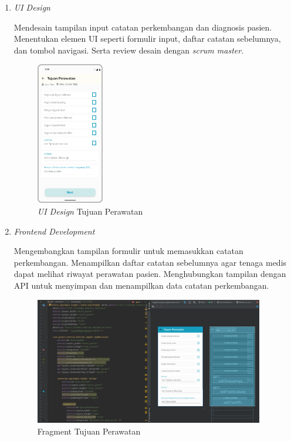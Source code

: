 \begin{enumerate}
\item \textit{UI Design}

Mendesain tampilan input catatan perkembangan dan diagnosis pasien. Menentukan elemen UI seperti formulir input, daftar catatan sebelumnya, dan tombol navigasi. Serta review desain dengan \textit{scrum master}.
	\begin{figure}[H]
		\centering
		\includegraphics[keepaspectratio, width=3cm]{gambar/tampilan_tujuan_perawatan}
		\caption{\textit{UI Design} Tujuan Perawatan}
		\label{gambar:tampilan_tujuan_perawatan}
	\end{figure}
\item \textit{Frontend Development}

Mengembangkan tampilan formulir untuk memasukkan catatan perkembangan. Menampilkan daftar catatan sebelumnya agar tenaga medis dapat melihat riwayat perawatan pasien. Menghubungkan tampilan dengan API untuk menyimpan dan menampilkan data catatan perkembangan.
	\begin{figure}[H]
		\centering
		\includegraphics[keepaspectratio, width=10cm]{gambar/fragment_tujuan_perawatan}
		\caption{Fragment Tujuan Perawatan}
		\label{gambar:fragment_tujuan_perawatan}
	\end{figure}

\end{enumerate}

